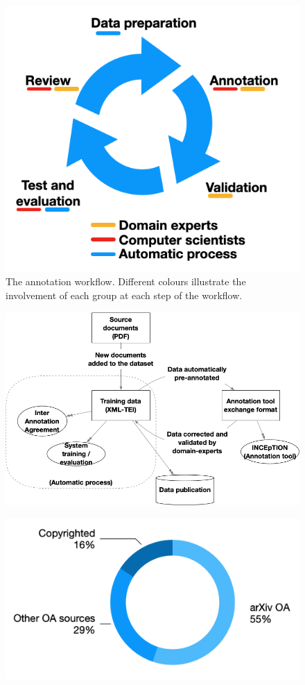 \documentclass[fleqn,10pt]{wlscirep}
\begin{document}
\begin{figure}[htb]
\centering
  \centering
  \includegraphics[width=0.5\linewidth]{workflow-schema}
  \caption{The annotation workflow. Different colours illustrate the involvement of each group at each step of the workflow.}
  \label{fig:schema-comparison-modified-workflow}
\end{figure}

\begin{figure}[htb]
    \centering
    \includegraphics[width=\linewidth]{data-transformation.png}
    \label{fig:data-transformation}
\end{figure}

\begin{figure}[ht]
    \centering
    \includegraphics[width=0.7\linewidth]{papers-by-sources.png}
    \label{fig:arxiv-rate}
\end{figure}
\end{document}
